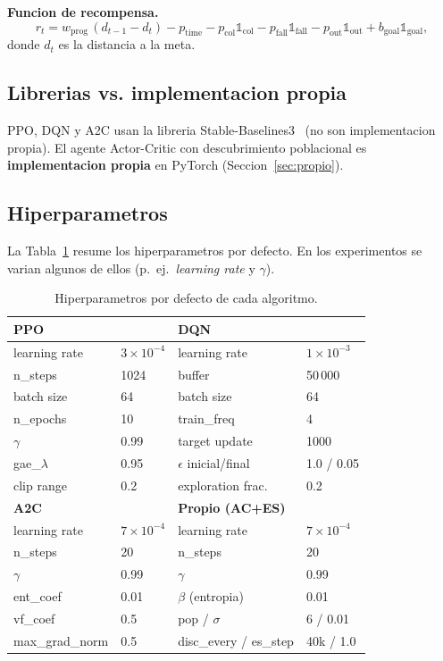 \documentclass[conference]{IEEEtran}
\begin{document}
\textbf{Funcion de recompensa.}
\begin{equation}
r_t = w_{\text{prog}}\,(d_{t-1}-d_t) - p_{\text{time}}
      - p_{\text{col}}\mathbb{1}_{\text{col}}
      - p_{\text{fall}}\mathbb{1}_{\text{fall}}
      - p_{\text{out}}\mathbb{1}_{\text{out}}
      + b_{\text{goal}}\mathbb{1}_{\text{goal}},
\end{equation}
donde $d_t$ es la distancia a la meta.

\subsection{Librerias vs. implementacion propia}
PPO, DQN y A2C usan la libreria Stable-Baselines3~\cite{sb3} (no son
implementacion propia). El agente Actor-Critic con descubrimiento poblacional es
\textbf{implementacion propia} en PyTorch (Seccion~\ref{sec:propio}).

\subsection{Hiperparametros}
La Tabla~\ref{tab:hyper} resume los hiperparametros por defecto. En los
experimentos se varian algunos de ellos (p.\ ej.\ \emph{learning rate} y
$\gamma$).

\begin{table}[t]
\caption{Hiperparametros por defecto de cada algoritmo.}
\label{tab:hyper}
\centering
\small
\begin{tabular}{@{}llll@{}}
\toprule
\textbf{PPO} & & \textbf{DQN} & \\
\midrule
learning rate & $3\!\times\!10^{-4}$ & learning rate & $1\!\times\!10^{-3}$ \\
n\_steps & 1024 & buffer & 50\,000 \\
batch size & 64 & batch size & 64 \\
n\_epochs & 10 & train\_freq & 4 \\
$\gamma$ & 0.99 & target update & 1000 \\
gae\_$\lambda$ & 0.95 & $\epsilon$ inicial/final & 1.0 / 0.05 \\
clip range & 0.2 & exploration frac. & 0.2 \\
\midrule
\textbf{A2C} & & \textbf{Propio (AC+ES)} & \\
\midrule
learning rate & $7\!\times\!10^{-4}$ & learning rate & $7\!\times\!10^{-4}$ \\
n\_steps & 20 & n\_steps & 20 \\
$\gamma$ & 0.99 & $\gamma$ & 0.99 \\
ent\_coef & 0.01 & $\beta$ (entropia) & 0.01 \\
vf\_coef & 0.5 & pop / $\sigma$ & 6 / 0.01 \\
max\_grad\_norm & 0.5 & disc\_every / es\_step & 40k / 1.0 \\
\bottomrule
\end{tabular}
\end{table}
\end{document}

